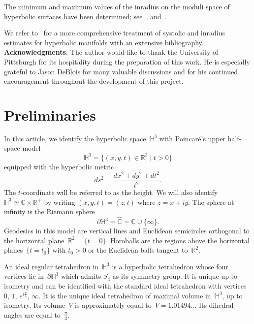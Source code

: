 \documentclass[11pt,reqno]{amsart}
\theoremstyle{definition}
\numberwithin{equation}{section}
\newcommand\R {{\mathbb R}}
\newcommand\C {{\mathbb C}}
\newcommand{\HH}{{\mathbb H}}
\numberwithin{equation}{section}
\begin{document}
\medskip

The minimum and maximum values of the inradius on the moduli space of hyperbolic surfaces have been determined; see~\cite{Y}, \cite{B} and~\cite{D}.

\medskip

We refer to~\cite{gen} for a more comprehensive treatment of systolic and inradius estimates for hyperbolic manifolds with an extensive bibliography. \\

{\bf Acknowledgments.} The author would like to thank the University of Pittsburgh for its hospitality during the preparation of this work.
He is especially grateful to Jason DeBlois for many valuable discussions and for his continued encouragement throughout the development of this project.

\section{Preliminaries}

In this article, we identify the hyperbolic space~$\HH^3$ with Poincar\'e's upper half-space model
\[
\HH^3 = \{ (x,y,t) \in \R^3 \mid t > 0 \}
\]
equipped with the hyperbolic metric 
\[
ds^2 = \frac{dx^2+dy^2+dt^2}{t^2}.
\]
The $t$-coordinate will be referred to as the height.
We will also identify $\HH^3 \simeq \C \times \R^+$ by writing $(x,y,t)=(z,t)$ where $z=x+iy$.
The sphere at infinity is the Riemann sphere
\[
\partial \HH^3 = \hat{\C}=\C \cup \{ \infty \}.
\]
Geodesics in this model are vertical lines and Euclidean semicircles orthogonal to the horizontal plane~$\R^2=\{t=0\}$.
Horoballs are the regions above the horizontal planes~$\{t=t_0\}$ with $t_0>0$ or the Euclidean balls tangent to~$\R^2$.

\medskip

An ideal regular tetrahedron in~$\HH^3$ is a hyperbolic tetrahedron whose four vertices lie in~$\partial \HH^3$ which admits $S_4$ as its symmetry group.
It is unique up to isometry and can be identified with the standard ideal tetrahedron with vertices $0$, $1$, $e^{i \frac{\pi}{3}}$, $\infty$.
It is the unique ideal tetrahedron of maximal volume in~$\HH^3$, up to isometry.
Its volume~$V$ is approximately equal to~$V = 1.01494...$
Its dihedral angles are equal to~$\frac{\pi}{3}$.
\end{document}
